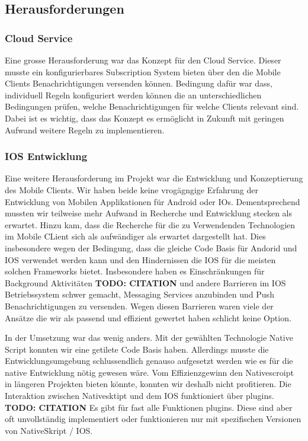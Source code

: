 \subsection{Herausforderungen}

\subsubsection*{Cloud Service}

Eine grosse Herausforderung war das Konzept für den Cloud Service.
Dieser musste ein konfigurierbares Subscription System bieten über den die Mobile Clients Benachrichtigungen versenden können.
Bedingung dafür war dass, individuell Regeln konfiguriert werden können die an unterschiedlichen Bedingungen prüfen, welche Benachrichtigungen für welche Clients relevant sind.
Dabei ist es wichtig, dass das Konzept es ermöglicht in Zukunft mit geringen Aufwand weitere Regeln zu implementieren.

\subsubsection*{IOS Entwicklung}

Eine weitere Herausforderung im Projekt war die Entwicklung und Konzeptierung des Mobile Clients.
Wir haben beide keine vrogägngige Erfahrung der Entwicklung von Mobilen Applikationen für Android oder IOs.
Dementsprechend mussten wir teilweise mehr Aufwand in Recherche und Entwicklung stecken als erwartet.
Hinzu kam, dass die Recherche für die zu Verwendenden Technologien im Mobile CLient sich als aufwändiger als erwartet dargestellt hat.
Dies insbesondere wegen der Bedingung, dass die gleiche Code Basis für Andorid und IOS verwendet werden kann und den Hindernissen die IOS für die meisten solchen Frameworks bietet.
Insbesondere haben es Einschränkungen für Background Aktivitäten \textbf{TODO: CITATION} und andere Barrieren im IOS Betriebssystem schwer gemacht, Messaging Services anzubinden und Push Benachrichtigungen zu versenden.
Wegen diesen Barrieren waren viele der Ansätze die wir als passend und effizient gewertet haben schlicht keine Option.

In der Umsetzung war das wenig anders.
Mit der gewählten Technologie Native Script konnten wir eine getilete Code Basis haben.
Allerdings musste die Entwicklungsumgebung schlussendlich genauso aufgesetzt werden wie es für die native Entwicklung nötig gewesen wäre.
Vom Effizienzgewinn den Nativescroipt in längeren Projekten bieten könnte, konnten wir deshalb nicht profitieren.
Die Interaktion zwischen Nativesktipt und dem IOS funktioniert über plugins. \textbf{TODO: CITATION}
Es gibt für fast alle Funktionen plugins.
Diese sind aber oft unvollständig implementiert oder funktionieren nur mit spezifischen Versionen von NativeSkript / IOS.


